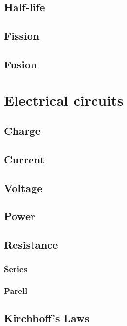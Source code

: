 \documentclass{book}
\begin{document}
\section{Half-life}


\section{Fission}


\section{Fusion}



\chapter{Electrical circuits}
\section{Charge}


\section{Current}


\section{Voltage}


\section{Power}


\section{Resistance}
\subsection{Series}

\subsection{Parell}

\section{Kirchhoff's Laws}
\end{document}
